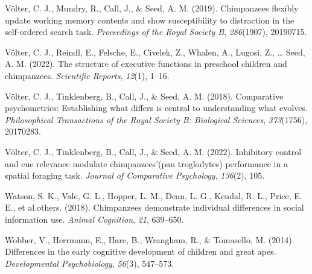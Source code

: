 \documentclass[
  man,floatsintext]{apa6}
\newlength{\cslhangindent}
\newlength{\cslentryspacingunit} %
\newenvironment{CSLReferences}[2] %
 {%
  \setlength{\parindent}{0pt}
  \ifodd #1
  \let\oldpar\par
  \def\par{\hangindent=\cslhangindent\oldpar}
  \fi
  \setlength{\parskip}{#2\cslentryspacingunit}
 }%
 {}
\begin{document}
\begin{CSLReferences}{1}{0}
\leavevmode{}%
Völter, C. J., Mundry, R., Call, J., \& Seed, A. M. (2019). Chimpanzees flexibly update working memory contents and show susceptibility to distraction in the self-ordered search task. \emph{Proceedings of the Royal Society B}, \emph{286}(1907), 20190715.

\leavevmode{}%
Völter, C. J., Reindl, E., Felsche, E., Civelek, Z., Whalen, A., Lugosi, Z., \ldots{} Seed, A. M. (2022). The structure of executive functions in preschool children and chimpanzees. \emph{Scientific Reports}, \emph{12}(1), 1--16.

\leavevmode{}%
Völter, C. J., Tinklenberg, B., Call, J., \& Seed, A. M. (2018). Comparative psychometrics: Establishing what differs is central to understanding what evolves. \emph{Philosophical Transactions of the Royal Society B: Biological Sciences}, \emph{373}(1756), 20170283.

\leavevmode{}%
Völter, C. J., Tinklenberg, B., Call, J., \& Seed, A. M. (2022). Inhibitory control and cue relevance modulate chimpanzees'(pan troglodytes) performance in a spatial foraging task. \emph{Journal of Comparative Psychology}, \emph{136}(2), 105.

\leavevmode{}%
Watson, S. K., Vale, G. L., Hopper, L. M., Dean, L. G., Kendal, R. L., Price, E. E., et al.others. (2018). Chimpanzees demonstrate individual differences in social information use. \emph{Animal Cognition}, \emph{21}, 639--650.

\leavevmode{}%
Wobber, V., Herrmann, E., Hare, B., Wrangham, R., \& Tomasello, M. (2014). Differences in the early cognitive development of children and great apes. \emph{Developmental Psychobiology}, \emph{56}(3), 547--573.

\end{CSLReferences}
\end{document}
